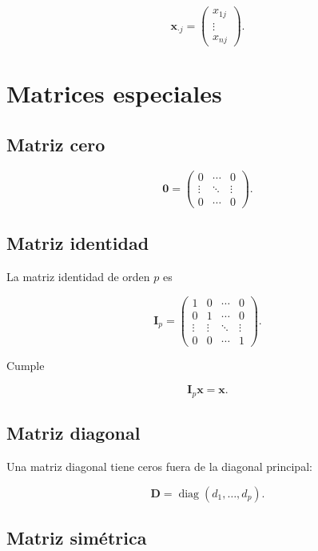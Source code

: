 \documentclass[
  spanish,
  11pt,
  letterpaper,
  DIV=11,
  numbers=noendperiod]{scrreprt}
\theoremstyle{definition}
\theoremstyle{plain}
\theoremstyle{definition}
\theoremstyle{remark}
\begin{document}
\[
\mathbf{x}_{\cdot j}
=
\begin{pmatrix}
x_{1j}\\
\vdots\\
x_{nj}
\end{pmatrix}.
\]

\section{Matrices especiales}\label{matrices-especiales}

\subsection{Matriz cero}\label{matriz-cero}

\[
\mathbf{0}
=
\begin{pmatrix}
0 & \cdots & 0\\
\vdots & \ddots & \vdots\\
0 & \cdots & 0
\end{pmatrix}.
\]

\subsection{Matriz identidad}\label{matriz-identidad}

La matriz identidad de orden \(p\) es

\[
\mathbf{I}_p
=
\begin{pmatrix}
1 & 0 & \cdots & 0\\
0 & 1 & \cdots & 0\\
\vdots & \vdots & \ddots & \vdots\\
0 & 0 & \cdots & 1
\end{pmatrix}.
\]

Cumple

\[
\mathbf{I}_p\mathbf{x}=\mathbf{x}.
\]

\subsection{Matriz diagonal}\label{matriz-diagonal}

Una matriz diagonal tiene ceros fuera de la diagonal principal:

\[
\mathbf{D}
=
\operatorname{diag}(d_1,\ldots,d_p).
\]

\subsection{Matriz simétrica}\label{matriz-simuxe9trica}
\end{document}
